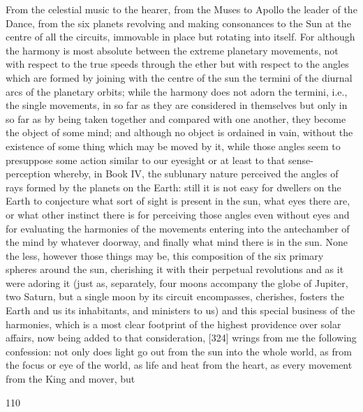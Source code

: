 \documentclass{article}
\begin{document}
From the celestial music to the hearer, from the Muses to Apollo the
leader of the Dance, from the six planets revolving and making
consonances to the Sun at the centre of all the circuits, immovable in
place but rotating into itself. For although the harmony is most absolute
between the extreme planetary movements, not with respect to the true
speeds through the ether but with respect to the angles which are formed
by joining with the centre of the sun the termini of the diurnal arcs of the
planetary orbits; while the harmony does not adorn the termini, i.e., the
single movements, in so far as they are considered in themselves but only
in so far as by being taken together and compared with one another, they
become the object of some mind; and although no object is ordained in
vain, without the existence of some thing which may be moved by it,
while those angles seem to presuppose some action similar to our
eyesight or at least to that sense-perception whereby, in Book IV, the
sublunary nature perceived the angles of rays formed by the planets on
the Earth: still it is not easy for dwellers on the Earth to conjecture what
sort of sight is present in the sun, what eyes there are, or what other
instinct there is for perceiving those angles even without eyes and for
evaluating the harmonies of the movements entering into the
antechamber of the mind by whatever doorway, and finally what mind
there is in the sun. None the less, however those things may be, this
composition of the six primary spheres around the sun, cherishing it
with their perpetual revolutions and as it were adoring it (just as,
separately, four moons accompany the globe of Jupiter, two Saturn, but a
single moon by its circuit encompasses, cherishes, fosters the Earth and
us its inhabitants, and ministers to us) and this special business of the
harmonies, which is a most clear footprint of the highest providence over
solar affairs, now being added to that consideration, [324] wrings from
me the following confession: not only does light go out from the sun into
the whole world, as from the focus or eye of the world, as life and heat
from the heart, as every movement from the King and mover, but


110
\end{document}
